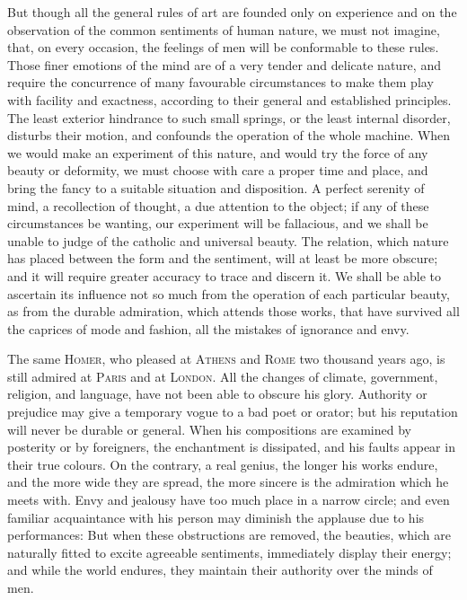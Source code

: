 But though all the general rules of art are founded only on experience
and on the observation of the common sentiments of human nature, we
must not imagine, that, on every occasion, the feelings of men will be
conformable to these rules. Those finer emotions of the mind are of a
very tender and delicate nature, and require the concurrence of many
favourable circumstances to make them play with facility and
exactness, according to their general and established principles. The
least exterior hindrance to such small springs, or the least internal
disorder, disturbs their motion, and confounds the operation of the
whole machine. When we would make an experiment of this nature, and
would try the force of any beauty or deformity, we must choose with
care  a proper time and place, and bring the fancy to a
suitable situation and disposition. A perfect serenity of mind, a
recollection of thought, a due attention to the object; if any of
these circumstances be wanting, our experiment will be fallacious, and
we shall be unable to judge of the catholic and universal beauty. The
relation, which nature has placed between the form and the sentiment,
will at least be more obscure; and it will require greater accuracy to
trace and discern it. We shall be able to ascertain its influence not
so much from the operation of each particular beauty, as from the
durable admiration, which attends those works, that have survived all
the caprices of mode and fashion, all the mistakes of ignorance and
envy.

The same \textsc{Homer}, who pleased at \textsc{Athens} and
\textsc{Rome} two thousand years ago, is still admired at
\textsc{Paris} and at \textsc{London}. All the changes of climate,
government, religion, and language, have not been able to obscure
his glory. Authority or prejudice may give a temporary vogue to a bad
poet or orator; but his reputation will never be durable or general.
When his compositions are examined by posterity or by foreigners, the
enchantment is dissipated, and his faults appear in their true
colours. On the contrary, a real genius, the longer his works endure,
and the more wide they are spread, the more sincere is the admiration
which he meets with. Envy and jealousy have too much place in a
narrow circle; and even familiar acquaintance with his person may
diminish the applause due to his performances: But when these
obstructions are removed, the beauties, which are naturally fitted to
excite agreeable sentiments, immediately display their energy; and
while the world endures, they maintain their authority over the minds
of men.

